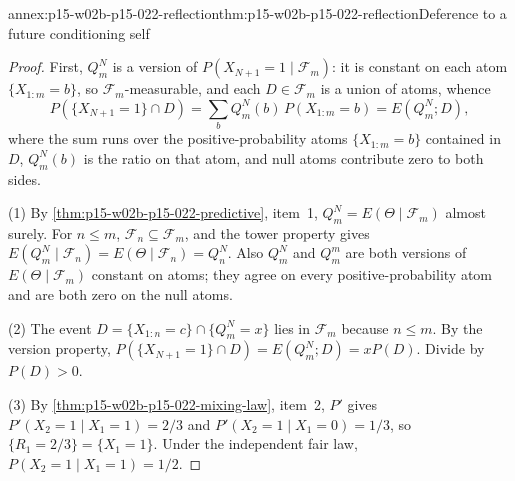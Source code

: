 \begin{annexitem}{annex:p15-w02b-p15-022-reflection}{thm:p15-w02b-p15-022-reflection}{Deference to a future conditioning self}
\begin{proof}
First, \(Q^N_m\) is a version of \(P(X_{N+1}=1\mid\mathcal F_m)\): it is
constant on each atom \(\{X_{1:m}=b\}\), so \(\mathcal F_m\)-measurable,
and each \(D\in\mathcal F_m\) is a union of atoms, whence
\[
 P(\{X_{N+1}=1\}\cap D)
   =\sum_{b}Q^N_m(b)\,P(X_{1:m}=b)
   =E(Q^N_m;D),
\]
where the sum runs over the positive-probability atoms \(\{X_{1:m}=b\}\)
contained in \(D\), \(Q^N_m(b)\) is the ratio on that atom, and null atoms
contribute zero to both sides.

(1) By \cref{thm:p15-w02b-p15-022-predictive}, item~1,
\(Q^N_m=E(\Theta\mid\mathcal F_m)\) almost surely. For \(n\leq m\),
\(\mathcal F_n\subseteq\mathcal F_m\), and the tower property gives
\(E(Q^N_m\mid\mathcal F_n)=E(\Theta\mid\mathcal F_n)=Q^N_n\). Also
\(Q^N_m\) and \(Q^m_m\) are both versions of \(E(\Theta\mid\mathcal F_m)\)
constant on atoms; they agree on every positive-probability atom and are
both zero on the null atoms.

(2) The event \(D=\{X_{1:n}=c\}\cap\{Q^N_m=x\}\) lies in \(\mathcal F_m\)
because \(n\leq m\). By the version property,
\(P(\{X_{N+1}=1\}\cap D)=E(Q^N_m;D)=xP(D)\). Divide by \(P(D)>0\).

(3) By \cref{thm:p15-w02b-p15-022-mixing-law}, item~2, \(P'\) gives
\(P'(X_2=1\mid X_1=1)=2/3\) and \(P'(X_2=1\mid X_1=0)=1/3\), so
\(\{R_1=2/3\}=\{X_1=1\}\). Under the independent fair law,
\(P(X_2=1\mid X_1=1)=1/2\).
\end{proof}
\end{annexitem}

